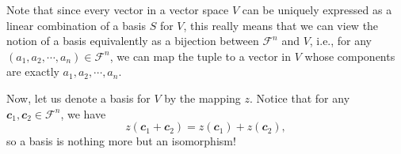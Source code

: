 \documentclass[math, code]{amznotes}
\theoremstyle{remark}
\begin{document}
Note that since every vector in a vector space $V$ can be uniquely expressed as a linear combination of a basis $S$ for $V$, this really means that we can view the notion of a basis equivalently as a bijection between $\mathcal{F}^n$ and $V$, i.e., for any $(a_1, a_2, \cdots, a_n) \in \mathcal{F}^n$, we can map the tuple to a vector in $V$ whose components are exactly $a_1, a_2, \cdots, a_n$.

Now, let us denote a basis for $V$ by the mapping $z$. Notice that for any $\mathbfit{c}_1, \mathbfit{c}_2 \in \mathcal{F}^n$, we have 
\begin{equation*}
    z(\mathbfit{c}_1 + \mathbfit{c}_2) = z(\mathbfit{c}_1) + z(\mathbfit{c}_2),
\end{equation*}
so a basis is nothing more but an isomorphism!
\end{document}
